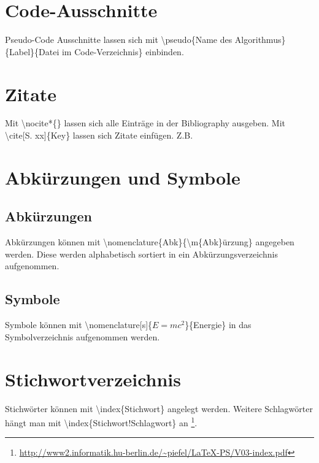 \section{Code-Ausschnitte}
Pseudo-Code Ausschnitte lassen sich mit \textbackslash pseudo\{Name des Algorithmus\}\{Label\}\{Datei im Code-Verzeichnis\} einbinden.
\section{Zitate}
Mit \textbackslash nocite*\{\} lassen sich alle Einträge in der Bibliography ausgeben. Mit \textbackslash cite[S. xx]\{Key\} lassen sich Zitate einfügen. Z.B. \cite[S. 234]{Kurose12} \nocite*{}
\section{Abkürzungen und Symbole}
\subsection{Abkürzungen}
Abkürzungen können mit \textbackslash nomenclature\{Abk\}\{\textbackslash m\{Abk\}ürzung\}  angegeben werden. Diese werden alphabetisch sortiert in ein Abkürzungsverzeichnis aufgenommen.
\subsection{Symbole}
Symbole können mit \textbackslash nomenclature[s]\{$E=mc^2$\}\{Energie\}
 in das Symbolverzeichnis aufgenommen werden.
\section{Stichwortverzeichnis}
Stichwörter können mit \textbackslash index\{Stichwort\} angelegt werden. Weitere Schlagwörter hängt man mit \textbackslash index\{Stichwort!Schlagwort\} an \footnote{\url{http://www2.informatik.hu-berlin.de/~piefel/LaTeX-PS/V03-index.pdf}}.
